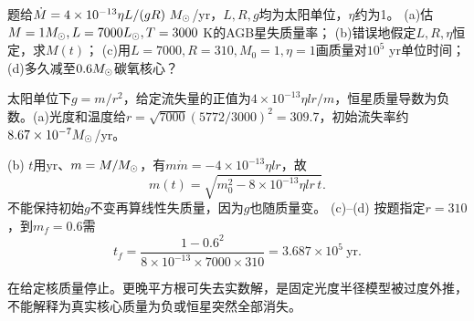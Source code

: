 \begin{exercise}
题给$\dot M=4\times10^{-13}\eta L/(gR)\ \Ms$/yr，$L,R,g$均为太阳单位，$\eta$约为1。
(a)估$M=1M_{\odot},L=7000L_{\odot},T=3000$ K的AGB星失质量率；
(b)错误地假定$L,R,\eta$恒定，求$M(t)$；
(c)用$L=7000,R=310,M_0=1,\eta=1$画质量对$10^5$ yr单位时间；
(d)多久减至$0.6M_{\odot}$碳氧核心？
\end{exercise}
\begin{solution}
太阳单位下$g=m/r^2$，给定流失量的正值为$4\times10^{-13}\eta lr/m$，恒星质量导数为负数。(a)光度和温度给$r=\sqrt{7000}(5772/3000)^2=309.7$，初始流失率约$8.67\times10^{-7}M_{\odot}$/yr。

(b) $t$用yr、$m=M/M_{\odot}$，有$m\dot m=-4\times10^{-13}\eta lr$，故
\[
 m(t)=\sqrt{m_0^2-8\times10^{-13}\eta lr\,t}.
\]
不能保持初始$g$不变再算线性失质量，因为$g$也随质量变。
(c)--(d) 按题指定$r=310$，到$m_f=0.6$需
\[
 t_f=\frac{1-0.6^2}{8\times10^{-13}\times7000\times310}
 =3.687\times10^5\ \mathrm{yr}.
\]
\begin{center}\end{center}
在给定核质量停止。更晚平方根可失去实数解，是固定光度半径模型被过度外推，不能解释为真实核心质量为负或恒星突然全部消失。
\end{solution}
